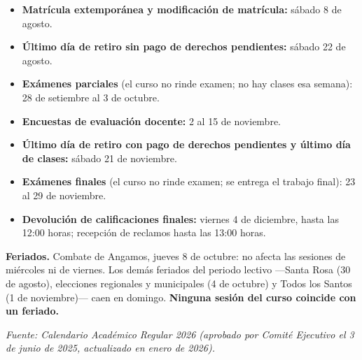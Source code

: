 \documentclass[11pt]{article}
\begin{document}
\begin{itemize}
\item \textbf{Matr\'icula extempor\'anea y modificaci\'on de matr\'icula:} s\'abado 8 de agosto.
\item \textbf{\'Ultimo d\'ia de retiro sin pago de derechos pendientes:} s\'abado 22 de agosto.
\item \textbf{Ex\'amenes parciales} (el curso no rinde examen; no hay clases esa semana): 28 de setiembre al 3 de octubre.
\item \textbf{Encuestas de evaluaci\'on docente:} 2 al 15 de noviembre.
\item \textbf{\'Ultimo d\'ia de retiro con pago de derechos pendientes y \'ultimo d\'ia de clases:} s\'abado 21 de noviembre.
\item \textbf{Ex\'amenes finales} (el curso no rinde examen; se entrega el trabajo final): 23 al 29 de noviembre.
\item \textbf{Devoluci\'on de calificaciones finales:} viernes 4 de diciembre, hasta las 12:00 horas; recepci\'on de reclamos hasta las 13:00 horas.
\end{itemize}

\textbf{Feriados.} Combate de Angamos, jueves 8 de octubre: no afecta las sesiones de mi\'ercoles ni de viernes. Los dem\'as feriados del periodo lectivo ---Santa Rosa (30 de agosto), elecciones regionales y municipales (4 de octubre) y Todos los Santos (1 de noviembre)--- caen en domingo. \textbf{Ninguna sesi\'on del curso coincide con un feriado.}

\emph{Fuente: Calendario Acad\'emico Regular 2026 (aprobado por Comit\'e Ejecutivo el 3 de junio de 2025, actualizado en enero de 2026).}
\end{document}
